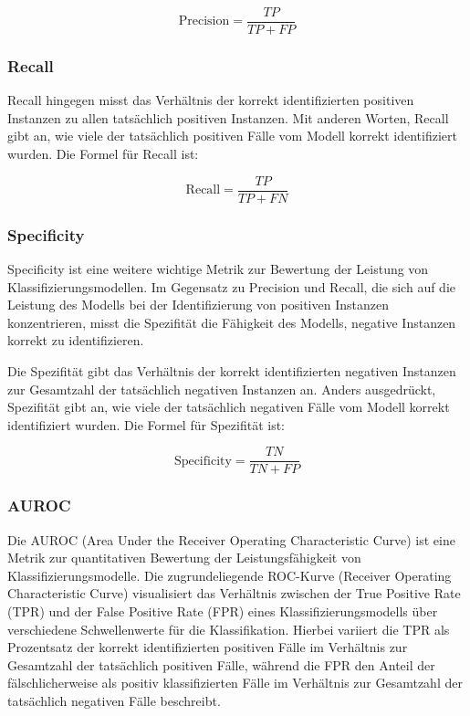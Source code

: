\begin{equation}
    \text{Precision} = \frac{TP}{TP + FP}
\label{PrecisionFormula}
\end{equation}


\subsubsection{Recall}

Recall hingegen misst das Verhältnis der korrekt identifizierten positiven Instanzen zu allen tatsächlich positiven Instanzen. Mit anderen Worten, Recall gibt an, wie viele der tatsächlich positiven Fälle vom Modell korrekt identifiziert wurden. Die Formel für Recall ist:

\begin{equation}
    \text{Recall} = \frac{TP}{TP + FN}
\label{RecallFormula}
\end{equation}

\subsubsection{Specificity}
Specificity ist eine weitere wichtige Metrik zur Bewertung der Leistung von Klassifizierungsmodellen. Im Gegensatz zu Precision und Recall, die sich auf die Leistung des Modells bei der Identifizierung von positiven Instanzen konzentrieren, misst die Spezifität die Fähigkeit des Modells, negative Instanzen korrekt zu identifizieren.

Die Spezifität gibt das Verhältnis der korrekt identifizierten negativen Instanzen zur Gesamtzahl der tatsächlich negativen Instanzen an. Anders ausgedrückt, Spezifität gibt an, wie viele der tatsächlich negativen Fälle vom Modell korrekt identifiziert wurden. Die Formel für Spezifität ist:

\begin{equation}
    \text{Specificity} = \frac{TN}{TN + FP}
\label{SpecificityFormula}
\end{equation}

\subsubsection{AUROC}
Die AUROC (Area Under the Receiver Operating Characteristic Curve) ist eine Metrik zur quantitativen Bewertung der Leistungsfähigkeit von Klassifizierungsmodelle. Die zugrundeliegende ROC-Kurve (Receiver Operating Characteristic Curve) visualisiert das Verhältnis zwischen der True Positive Rate (TPR) und der False Positive Rate (FPR) eines Klassifizierungsmodells über verschiedene Schwellenwerte für die Klassifikation. Hierbei variiert die TPR als Prozentsatz der korrekt identifizierten positiven Fälle im Verhältnis zur Gesamtzahl der tatsächlich positiven Fälle, während die FPR den Anteil der fälschlicherweise als positiv klassifizierten Fälle im Verhältnis zur Gesamtzahl der tatsächlich negativen Fälle beschreibt.

